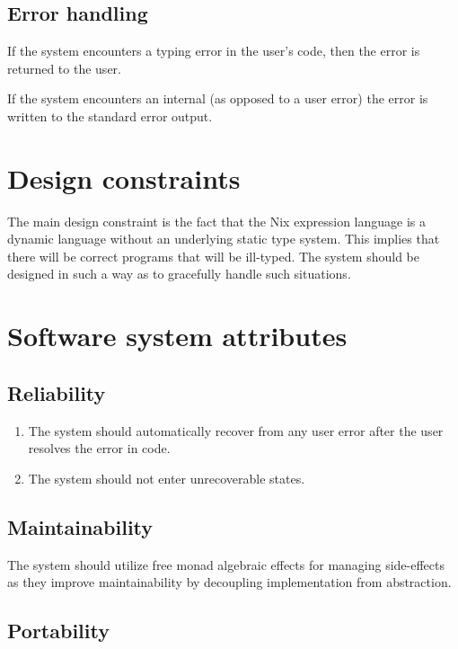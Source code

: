 \documentclass[12pt]{article}
\begin{document}
\subsection{Error handling}

If the system encounters a typing error in the user's code, then the error is returned to the user.

If the system encounters an internal (as opposed to a user error) the error is written to the standard error output.

\section{Design constraints}

The main design constraint is the fact that the Nix expression language is a dynamic language without an underlying static type system. This implies that there will be correct programs that will be ill-typed. The system should be designed in such a way as to gracefully handle such situations.

\section{Software system attributes}

\subsection{Reliability}

\begin{enumerate}
  \item The system should automatically recover from any user error after the user resolves the error in code.
  \item The system should not enter unrecoverable states.
\end{enumerate}

\subsection{Maintainability}

The system should utilize free monad algebraic effects for managing side-effects as they improve maintainability by decoupling implementation from abstraction.

\subsection{Portability}
\end{document}
